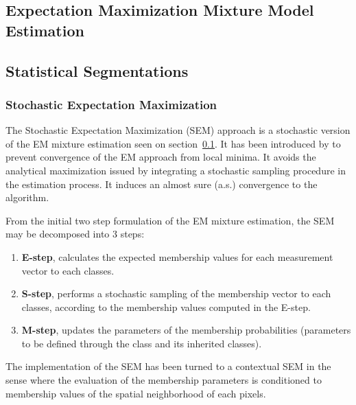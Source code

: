 \subsection{Expectation Maximization Mixture Model Estimation}
\label{sec:ExpectationMaximizationMixtureModelEstimation}

\ifitkFullVersion

\fi




\subsection{Statistical Segmentations}
\label{sec:StatisticalSegmentations}


\subsubsection{Stochastic Expectation Maximization}
\label{sec:SEM}

The Stochastic Expectation Maximization (SEM) approach is a stochastic 
version of the EM mixture estimation seen on
section~\ref{sec:ExpectationMaximizationMixtureModelEstimation}. It has been 
introduced by \cite{CeDi95} to prevent convergence of the EM approach from
local minima. It avoids the analytical maximization issued by integrating a
stochastic sampling procedure in the estimation process. It induces an almost
sure (a.s.) convergence to the algorithm.

From the initial two step formulation of the EM mixture estimation, the SEM
may be decomposed into 3 steps:
\begin{enumerate}
\item \textbf{E-step}, calculates the expected membership values for each 
measurement vector to each classes.
\item \textbf{S-step}, performs a stochastic sampling of the membership vector
to each classes, according to the membership values computed in the E-step.
\item \textbf{M-step}, updates the parameters of the membership probabilities
(parameters to be defined through the class
 and its inherited classes).
\end{enumerate}
The implementation of the SEM has been turned to a contextual SEM in the sense
where the evaluation of the membership parameters is conditioned to
membership values of the spatial neighborhood of each pixels.


